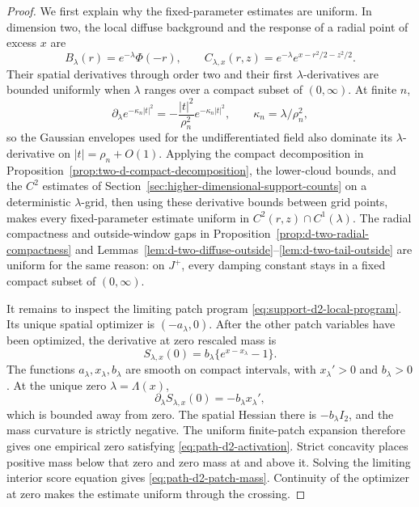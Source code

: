 \begin{proof}
We first explain why the fixed-parameter estimates are uniform. In dimension
two, the local diffuse background and the response of a radial point of excess
\(x\) are
\[
 B_\lambda(r)=e^{-\lambda}\Phi(-r),
 \qquad
 C_{\lambda,x}(r,z)=e^{-\lambda}e^{x-r^2/2-z^2/2}.
\]
Their spatial derivatives through order two and their first
\(\lambda\)-derivatives are bounded uniformly when \(\lambda\) ranges over a
compact subset of \((0,\infty)\). At finite \(n\),
\[
 \partial_\lambda e^{-\kappa_n|t|^2}
 =-\frac{|t|^2}{\rho_n^2}e^{-\kappa_n|t|^2},
 \qquad \kappa_n=\lambda/\rho_n^2,
\]
so the Gaussian envelopes used for the undifferentiated field also dominate
its \(\lambda\)-derivative on \(|t|=\rho_n+O(1)\). Applying the compact decomposition in
Proposition~\ref{prop:two-d-compact-decomposition}, the lower-cloud bounds, and
the \(C^2\) estimates of Section~\ref{sec:higher-dimensional-support-counts}
on a deterministic \(\lambda\)-grid, then using these derivative bounds
between grid points, makes every fixed-parameter estimate uniform in
\(C^2(r,z)\cap C^1(\lambda)\). The radial compactness and outside-window gaps
in Proposition~\ref{prop:d-two-radial-compactness} and
Lemmas~\ref{lem:d-two-diffuse-outside}--\ref{lem:d-two-tail-outside} are
uniform for the same reason: on \(J^+\), every damping constant stays in a
fixed compact subset of \((0,\infty)\).

It remains to inspect the limiting patch program
\eqref{eq:support-d2-local-program}. Its unique spatial optimizer is
\((-a_\lambda,0)\). After the other patch variables have been optimized, the
derivative at zero rescaled mass is
\begin{equation}
\label{eq:path-d2-boundary-score}
 S_{\lambda,x}(0)=b_\lambda\{e^{x-x_\lambda}-1\}.
\end{equation}
The functions \(a_\lambda,x_\lambda,b_\lambda\) are smooth on compact
intervals, with \(x_\lambda'>0\) and \(b_\lambda>0\). At the unique zero
\(\lambda=\Lambda(x)\),
\[
 \partial_\lambda S_{\lambda,x}(0)=-b_\lambda x_\lambda',
\]
which is bounded away from zero. The spatial Hessian there is
\(-b_\lambda I_2\), and the mass curvature is strictly negative. The uniform
finite-patch expansion therefore gives one empirical zero satisfying
\eqref{eq:path-d2-activation}. Strict concavity places positive mass below
that zero and zero mass at and above it. Solving the limiting interior score
equation gives \eqref{eq:path-d2-patch-mass}. Continuity of the optimizer at
zero makes the estimate uniform through the crossing.


\end{proof}
